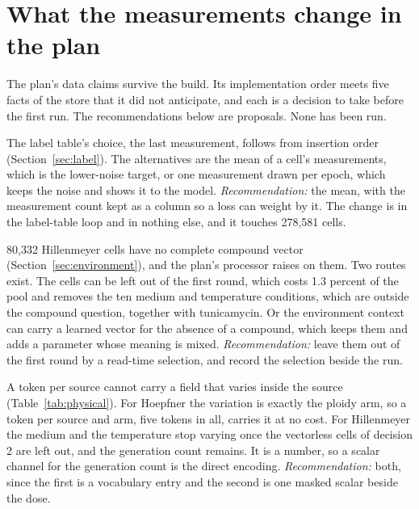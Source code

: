 
\section{What the measurements change in the plan}
\label{sec:next}

The plan's data claims survive the build. Its implementation order meets five facts of the
store that it did not anticipate, and each is a decision to take before the first run. The
recommendations below are proposals. None has been run.

The label table's choice, the last measurement, follows from insertion order
(Section~\ref{sec:label}). The alternatives are the mean of a cell's measurements, which
is the lower-noise target, or one measurement drawn per epoch, which keeps the noise and
shows it to the model. \textit{Recommendation:} the mean, with the measurement count kept
as a column so a loss can weight by it. The change is in the label-table loop and in
nothing else, and it touches 278{,}581 cells.

80{,}332 Hillenmeyer cells have no complete compound vector (Section~\ref{sec:environment}),
and the plan's processor raises on them. Two routes exist. The cells can be left out of
the first round, which costs 1.3 percent of the pool and removes the ten medium and
temperature conditions, which are outside the compound question, together with
tunicamycin. Or the environment context
can carry a learned vector for the absence of a compound, which keeps them and adds a
parameter whose meaning is mixed. \textit{Recommendation:} leave them out of the first
round by a read-time selection, and record the selection beside the run.

A token per source cannot carry a field that varies inside the source
(Table~\ref{tab:physical}). For Hoepfner the variation is exactly the ploidy arm, so a
token per source and arm, five tokens in all, carries it at no cost. For Hillenmeyer the
medium and the temperature stop varying once the vectorless cells of decision 2 are left
out, and the generation count remains. It is a number, so a scalar channel for the
generation count is the direct encoding. \textit{Recommendation:} both, since the first
is a vocabulary entry and the second is one masked scalar beside the dose.

